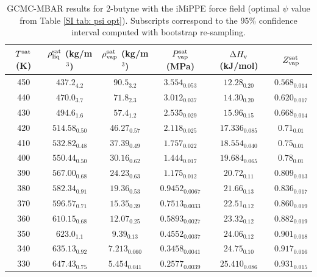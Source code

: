 \documentclass[journal=jctc,manuscript=article]{achemso}
\begin{document}
\begin{table}[htb!]
	\caption{GCMC-MBAR results for 2-butyne with the iMiPPE force field (optimal $\psi$ value from Table \ref{SI tab: psi opt}). Subscripts correspond to the 95\% confidence interval computed with bootstrap re-sampling.}
	\begin{center}
		\begin{tabular}{|c|c|c|c|c|c|}
			\hline
			$T^{\rm sat}$ (K) & $\rho_{\rm liq}^{\rm sat}$ (kg/m$^3$) & $\rho_{\rm vap}^{\rm sat}$ (kg/m$^3$) & $P_{\rm vap}^{\rm sat}$ (MPa) & $\Delta H_{\rm v}$ (kJ/mol) & $Z_{\rm vap}^{\rm sat}$ \\ \hline
			450 & $437.2_{4.2}$ & $90.5_{3.2}$ & $3.554_{0.053}$ & $12.28_{0.20}$ & $0.568_{0.014}$ \\
			440 & $470.0_{3.7}$ & $71.8_{2.3}$ & $3.012_{0.037}$ & $14.30_{0.20}$ & $0.620_{0.017}$ \\
			430 & $494.6_{1.6}$ & $57.4_{1.2}$ & $2.535_{0.029}$ & $15.96_{0.15}$ & $0.668_{0.014}$ \\
			420 & $514.58_{0.50}$ & $46.27_{0.57}$ & $2.118_{0.025}$ & $17.336_{0.085}$ & $0.71_{0.01}$ \\
			410 & $532.82_{0.48}$ & $37.39_{0.49}$ & $1.757_{0.022}$ & $18.554_{0.040}$ & $0.75_{0.01}$ \\
			400 & $550.44_{0.50}$ & $30.16_{0.62}$ & $1.444_{0.017}$ & $19.684_{0.065}$ & $0.78_{0.01}$ \\
			390 & $567.00_{0.68}$ & $24.23_{0.63}$ & $1.175_{0.012}$ & $20.72_{0.11}$ & $0.809_{0.013}$ \\
			380 & $582.34_{0.91}$ & $19.36_{0.53}$ & $0.9452_{0.0067}$ & $21.66_{0.13}$ & $0.836_{0.017}$ \\
			370 & $596.57_{0.71}$ & $15.35_{0.39}$ & $0.7513_{0.0033}$ & $22.51_{0.12}$ & $0.860_{0.019}$ \\
			360 & $610.15_{0.68}$ & $12.07_{0.25}$ & $0.5893_{0.0027}$ & $23.32_{0.12}$ & $0.882_{0.019}$ \\
			350 & $623.0_{1.1}$ & $9.39_{0.13}$ & $0.4552_{0.0037}$ & $24.06_{0.12}$ & $0.901_{0.018}$ \\
			340 & $635.13_{0.92}$ & $7.213_{0.060}$ & $0.3458_{0.0041}$ & $24.75_{0.10}$ & $0.917_{0.016}$ \\
			330 & $647.43_{0.75}$ & $5.454_{0.041}$ & $0.2577_{0.0039}$ & $25.410_{0.086}$ & $0.931_{0.015}$ \\
			\hline
		\end{tabular}
	\end{center}
\end{table}
\end{document}
